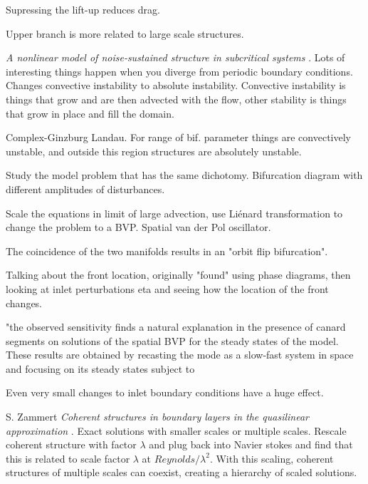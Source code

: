 \begin{description}
{\begin{description}
Supressing the lift-up reduces drag.

Upper branch is more related to large scale structures.

\item[E. Knobloch]
\textit{A nonlinear model of noise-sustained structure in subcritical systems}
.
Lots of interesting things happen when you diverge from periodic boundary conditions.
Changes convective instability to absolute instability. Convective instability
is things that grow and are then advected with the flow, other stability
is things that grow in place and fill the domain.

Complex-Ginzburg Landau. For range of bif. parameter things are convectively
unstable, and outside this region structures are absolutely unstable.

Study the model problem that has the same dichotomy.
Bifurcation diagram with different amplitudes of disturbances.

Scale the equations in limit of large advection, use Li\'enard transformation
to change the problem to a BVP.
Spatial van der Pol oscillator.

The coincidence of the two manifolds results in an "orbit flip bifurcation".

Talking about the front location, originally "found" using phase diagrams,
then looking at inlet perturbations eta and seeing how the location of the
front changes.

"the observed sensitivity finds a natural explanation in the
presence of canard segments on solutions of the spatial BVP
for the steady states of the model. These results are obtained by
recasting the mode as a slow-fast system in space and focusing on its steady states subject to

Even very small changes to inlet boundary conditions have a huge effect.

\item{S. Zammert}
\textit{Coherent structures in boundary layers in the quasilinear approximation}
.
Exact solutions with smaller scales or multiple scales.
Rescale coherent structure with factor $\lambda$ and plug back into Navier stokes and find
that this is related to scale factor $\lambda$ at $Reynolds / \lambda^2$.
With this scaling, coherent structures of multiple scales can coexist, creating a hierarchy of scaled
solutions.


\end{description}}
\end{description}
